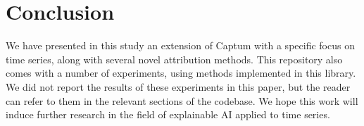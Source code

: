 \section{Conclusion}
\label{sec:conclusion}

We have presented in this study \texttt{} an extension of Captum with a specific focus on
time series, along with several novel attribution methods.
This repository also comes with a number of experiments, using methods implemented in this library.
We did not report the results of these experiments in this paper, but the reader can refer to them in the relevant
sections of the codebase.
We hope this work will induce further research in the field of explainable AI applied to time series.